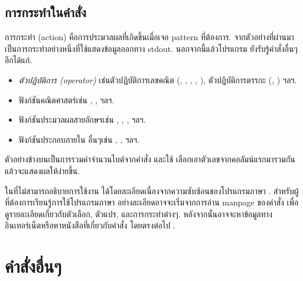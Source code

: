 \begin{thwbr}
\subsection{การกระทำในคำสั่ง }
การกระทำ (action) คือการประมวลผลที่เกิดขึ้นเมื่อเจอ pattern ที่ต้องการ. จากตัวอย่างที่ผ่านมา  เป็นการกระทำอย่างหนึ่งที่ใช้แสดงข้อมูลออกทาง stdout. นอกจากนี้แล้วโปรแกรม  ยังรับรู้คำสั่งอื่นๆอีกได้แก่.
\begin{itemize}
\item \emph{ตัวปฏิบัติการ (operator)} เช่นตัวปฏิบัติการเลขคณิต (\cmd{+}, \cmd{-}, \cmd{*}, \cmd{/}, \cmd{\%}), ตัวปฏิบัติการตรรกะ (\cmd{\&\&}, \cmd{||}) ฯลฯ.
\item ฟังก์ชันคณิตศาสตร์เช่น , ,  ฯลฯ.
\item ฟังก์ชันประมวลผลสายอักษรเช่น , , ,  ฯลฯ.
\item ฟังก์ชันประกอบภายใน  อื่นๆเช่น , ,  ฯลฯ.
\end{itemize}
\begin{MyExample}
\end{MyExample}
ตัวอย่างข้างบนเป็นการรวมค่าจำนวนไบต์จากคำสั่ง  และใช้  เลือกเอาตัวเลขจากคอลัมน์แรกมารวมกันแล้วจะแสดงผลให้ง่ายขึ้น.

\medskip
ในที่ไม่สามารถอธิบายการใช้งาน  ได้โดยละเอียดเนื่องจากความซับซ้อนของโปรแกรมภาษา . สำหรับผู้ที่ต้องการเรียนรู้การใช้โปรแกรมภาษา  อย่างละเอียดอาจจะเริ่มจากการอ่าน manpage ของคำสั่ง  เพื่อดูรายละเอียดเกี่ยวกับตัวเลือก, ตัวแปร, และการกระทำต่างๆ. หลังจากนั้นอาจจะหาข้อมูลทางอินเทอร์เน็ตหรือหาหนังสือที่เกี่ยวกับคำสั่ง  โดยตรงต่อไป \cite{sed}.



\section{คำสั่งอื่นๆ}

\end{thwbr}
